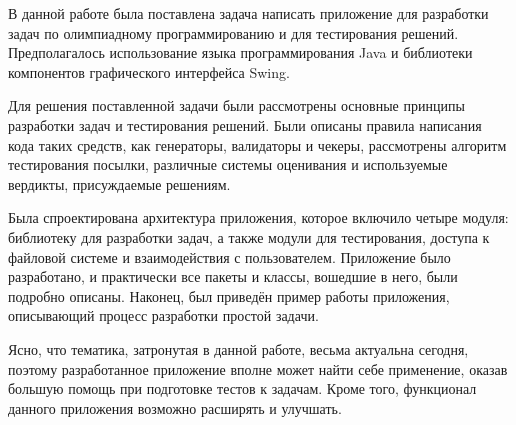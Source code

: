 В данной работе была поставлена задача написать приложение для разработки задач по олимпиадному программированию и для тестирования решений. Предполагалось использование языка программирования Java и библиотеки компонентов графического интерфейса Swing.

Для решения поставленной задачи были рассмотрены основные принципы разработки задач и тестирования решений. Были описаны правила написания кода таких средств, как генераторы, валидаторы и чекеры, рассмотрены алгоритм тестирования посылки, различные системы оценивания и используемые вердикты, присуждаемые решениям.

Была спроектирована архитектура приложения, которое включило четыре модуля: библиотеку для разработки задач, а также модули для тестирования, доступа к файловой системе и взаимодействия с пользователем. Приложение было разработано, и практически все пакеты и классы, вошедшие в него, были подробно описаны. Наконец, был приведён пример работы приложения, описывающий процесс разработки простой задачи.

Ясно, что тематика, затронутая в данной работе, весьма актуальна сегодня, поэтому разработанное приложение вполне может найти себе применение, оказав большую помощь при подготовке тестов к задачам. Кроме того, функционал данного приложения возможно расширять и улучшать.